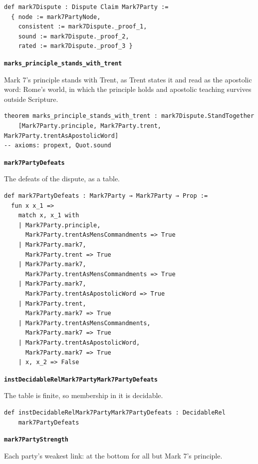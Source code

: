 \documentclass[11pt]{article}
\begin{document}
{\small\begin{verbatim}
def mark7Dispute : Dispute Claim Mark7Party :=
  { node := mark7PartyNode,
    consistent := mark7Dispute._proof_1,
    sound := mark7Dispute._proof_2,
    rated := mark7Dispute._proof_3 }
\end{verbatim}}
\par\medskip\noindent\textbf{\texttt{marks\_\allowbreak{}principle\_\allowbreak{}stands\_\allowbreak{}with\_\allowbreak{}trent}}\par\nobreak\noindent
Mark 7's principle stands with Trent, as Trent states it and read as the apostolic word: Rome's world, in which the principle holds and apostolic teaching survives outside Scripture.

{\small\begin{verbatim}
theorem marks_principle_stands_with_trent : mark7Dispute.StandTogether
    [Mark7Party.principle, Mark7Party.trent, Mark7Party.trentAsApostolicWord]
-- axioms: propext, Quot.sound
\end{verbatim}}
\par\medskip\noindent\textbf{\texttt{mark7\allowbreak{}Party\allowbreak{}Defeats}}\par\nobreak\noindent
The defeats of the dispute, as a table.

{\small\begin{verbatim}
def mark7PartyDefeats : Mark7Party → Mark7Party → Prop :=
  fun x x_1 =>
    match x, x_1 with
    | Mark7Party.principle,
      Mark7Party.trentAsMensCommandments => True
    | Mark7Party.mark7,
      Mark7Party.trent => True
    | Mark7Party.mark7,
      Mark7Party.trentAsMensCommandments => True
    | Mark7Party.mark7,
      Mark7Party.trentAsApostolicWord => True
    | Mark7Party.trent,
      Mark7Party.mark7 => True
    | Mark7Party.trentAsMensCommandments,
      Mark7Party.mark7 => True
    | Mark7Party.trentAsApostolicWord,
      Mark7Party.mark7 => True
    | x, x_2 => False
\end{verbatim}}
\par\medskip\noindent\textbf{\texttt{inst\allowbreak{}Decidable\allowbreak{}Rel\allowbreak{}Mark7\allowbreak{}Party\allowbreak{}Mark7\allowbreak{}Party\allowbreak{}Defeats}}\par\nobreak\noindent
The table is finite, so membership in it is decidable.

{\small\begin{verbatim}
def instDecidableRelMark7PartyMark7PartyDefeats : DecidableRel
    mark7PartyDefeats
\end{verbatim}}
\par\medskip\noindent\textbf{\texttt{mark7\allowbreak{}Party\allowbreak{}Strength}}\par\nobreak\noindent
Each party's weakest link: at the bottom for all but Mark 7's principle.
\end{document}
